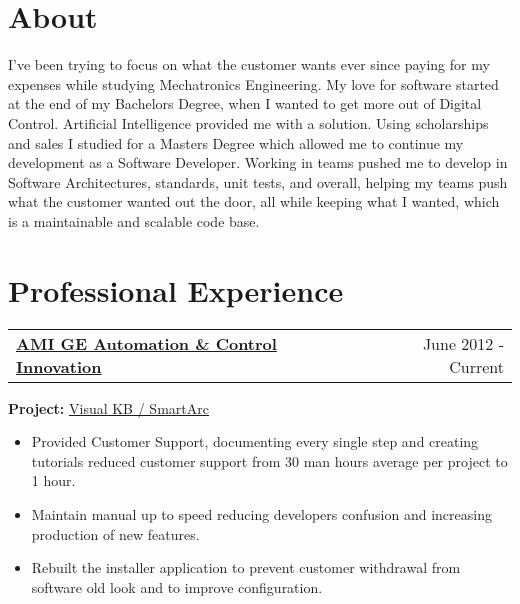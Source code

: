 \documentclass{scrartcl}
\begin{document}
\begin{minipage}[t]{0.69\textwidth}
	\section*{About}
		I've been trying to focus on what the customer wants ever since paying for my expenses while studying Mechatronics Engineering. My love for software started at the end of my Bachelors Degree, when I wanted to get more out of Digital Control. Artificial Intelligence provided me with a solution. Using scholarships and sales I studied for a Masters Degree which allowed me to continue my development as a Software Developer. Working in teams pushed me to develop in Software Architectures, standards, unit tests, and overall, helping my teams push what the customer wanted out the door, all while keeping what I wanted, which is a maintainable and scalable code base. 
		
\section*{Professional Experience}

	\begin{tabular*}{1\textwidth}{@{\extracolsep{\fill}}lr}
		\textcolor{Blue}{\textbf{\href{http://www.amige.com}{AMI GE Automation \& Control Innovation}}} & June 2012 - Current
	\end{tabular*}
	
	\textbf{Project:} \href{http://amige.com/meltshops_technological_controls_smartarc.html}{Visual KB / SmartArc}
	\begin{itemize}[noitemsep]
		\item Provided Customer Support, documenting every single step and creating tutorials reduced customer support from 30 man hours average per project to 1 hour.
		\item Maintain manual up to speed reducing developers confusion and increasing production of new features.
		\item Rebuilt the installer application to prevent customer withdrawal from software old look and to improve configuration. 
	\end{itemize}
	

\end{minipage}
\end{document}
